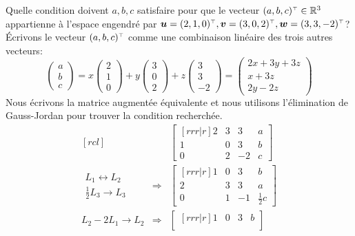 \begin{exemple}
Quelle condition doivent $a, b, c$ satisfaire pour que le vecteur $\transp{(a, b, c)} \in\BBR^3$ appartienne
à l'espace engendré par $\mat{u} = \transp{(2, 1, 0)}, \mat{v}=\transp{(3, 0, 2)}, \mat{w}=\transp{(3, 3, -2)}$?
\solution
Écrivons le vecteur $\transp{(a, b, c)}$ comme une combinaison linéaire des trois autres vecteurs:
\[
\begin{pmatrix}
a\\
b\\
c
\end{pmatrix}
=
x\begin{pmatrix}
2\\
1\\
0
\end{pmatrix}
+ y\begin{pmatrix}
3\\
0\\
2
\end{pmatrix}
+ z \begin{pmatrix}
3\\
3\\
-2
\end{pmatrix}
=
\begin{pmatrix}
2x + 3y + 3z\\
x + 3z\\
2y - 2z
\end{pmatrix}
\]
Nous écrivons la matrice augmentée équivalente et nous utilisons l'élimination de Gauss-Jordan pour
trouver la condition recherchée.
\[
\begin{matrix}[rcl]
&& \begin{bmatrix}[rrr|r]
2 & 3 & 3 & a\\
1 & 0 & 3 & b \\
0 & 2 & -2 & c
\end{bmatrix} \\[20pt]
\begin{matrix}
L_1 \leftrightarrow L_2 \\
\frac{1}{2}L_3 \rightarrow L_3
\end{matrix}
&\Rightarrow&
\begin{bmatrix}[rrr|r]
1 & 0 & 3 & b\\
2 & 3 & 3 & a \\
0 & 1 & -1 & \frac{1}{2}c
\end{bmatrix} \\[20pt]
L_2 - 2 L_1 \rightarrow L_2
&\Rightarrow&
\begin{bmatrix}[rrr|r]
1 & 0 & 3 & b\\

\end{bmatrix}
\end{matrix}\]
\end{exemple}
